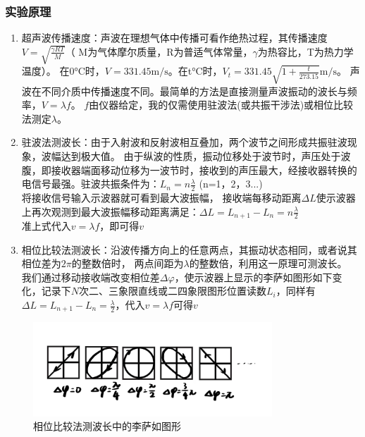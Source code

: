 \documentclass{Preport}
\begin{document}
\subsubsection{实验原理}
\begin{enumerate}
    \item 超声波传播速度：声波在理想气体中传播可看作绝热过程，其传播速度$V=\sqrt{\frac{\gamma RT}{M}}$（
    M为气体摩尔质量，R为普适气体常量，$\gamma$为热容比，T为热力学温度）。
    在0$\si{\degreeCelsius}$时，$V=331.45\si{\metre\per\second}$。在t$\si{\degreeCelsius}$时，$V_t = 331.45\sqrt{1+\frac{t}{273.15}}\si{\metre\per\second}$。
    声波在不同介质中传播速度不同。最简单的方法是直接测量声波振动的波长与频率，$V=\lambda f$。
    $f$由仪器给定，我的仅需使用驻波法(或共振干涉法)或相位比较法测定$\lambda$。
    \item 驻波法测波长：由于入射波和反射波相互叠加，两个波节之间形成共振驻波现象，波幅达到极大值。
    由于纵波的性质，振动位移处于波节时，声压处于波腹，即接收器端面移动位移为一波节时，接收到的声压最大，经接收器转换的电信号最强。驻波共振条件为：$L_n = n\frac{\lambda}{2}$ (n=1，2，3...)\\
    将接收信号输入示波器就可看到最大波振幅，
    接收端每移动距离$\Delta L$使示波器上再次观测到最大波振幅移动距离满足：$\Delta L = L_{n+1} - L_n = n\frac{\lambda}{2}$\\
    准上式代入$v=\lambda f$，即可得$v$
    \item 相位比较法测波长：沿波传播方向上的任意两点，其振动状态相同，或者说其相位差为$2\pi$的整数倍时，
    两点间距为$\lambda$的整数倍，利用这一原理可测波长。
    我们通过移动接收端改变相位差$\Delta\varphi$，使示波器上显示的李萨如图形如下变化，记录下$N$次二、三象限直线或二四象限图形位置读数$L_i$，同样有$\Delta L = L_{n+1} - L_n = \frac{\lambda}{2}$，代入$v=\lambda f$可得$v$
\end{enumerate}
\begin{figure}[H]
    \centering
    \includegraphics[width=0.8\textwidth]{figures/1.jpg}
    \caption{相位比较法测波长中的李萨如图形}
\end{figure}
\end{document}
